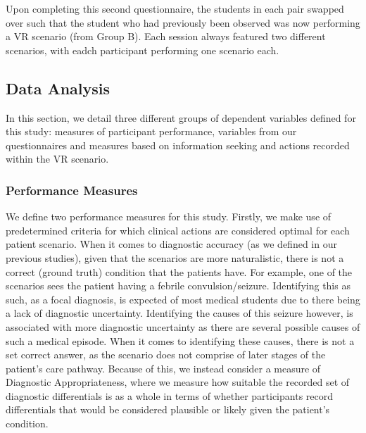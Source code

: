 \documentclass[a4paper, nobind]{templates/ociamthesis}
\begin{document}
Upon completing this second questionnaire, the students in each pair swapped over such that the student who had previously been observed was now performing a VR scenario (from Group B). Each session always featured two different scenarios, with eadch participant performing one scenario each.

\subsection{Data Analysis}\label{data-analysis-2}

In this section, we detail three different groups of dependent variables defined for this study: measures of participant performance, variables from our questionnaires and measures based on information seeking and actions recorded within the VR scenario.

\subsubsection{Performance Measures}\label{performance-measures}

We define two performance measures for this study. Firstly, we make use of predetermined criteria for which clinical actions are considered optimal for each patient scenario. When it comes to diagnostic accuracy (as we defined in our previous studies), given that the scenarios are more naturalistic, there is not a correct (ground truth) condition that the patients have. For example, one of the scenarios sees the patient having a febrile convulsion/seizure. Identifying this as such, as a focal diagnosis, is expected of most medical students due to there being a lack of diagnostic uncertainty. Identifying the causes of this seizure however, is associated with more diagnostic uncertainty as there are several possible causes of such a medical episode. When it comes to identifying these causes, there is not a set correct answer, as the scenario does not comprise of later stages of the patient's care pathway. Because of this, we instead consider a measure of Diagnostic Appropriateness, where we measure how suitable the recorded set of diagnostic differentials is as a whole in terms of whether participants record differentials that would be considered plausible or likely given the patient's condition.
\end{document}

